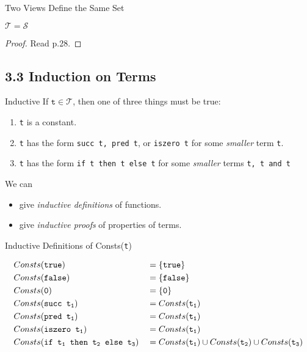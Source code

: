 \begin{frame}{Two Views Define the Same Set}
\begin{proposition}[3.2.6]
  $\mathcal{T} = \mathcal{S}$
\end{proposition}
\begin{proof}
  Read p.28.
\end{proof}
\end{frame}

\subsection*{3.3 Induction on Terms}

\begin{frame}{Inductive}
If $\mathtt{t} \in \mathcal{T}$, then one of three things must be true:
\begin{enumerate}
  \item \texttt{t} is a constant.
  \item \texttt{t} has the form \texttt{succ t, pred t}, or \texttt{iszero t} for some \textit{smaller} term \texttt{t}.
  \item \texttt{t} has the form \texttt{if t then t else t} for some \textit{smaller} terms \texttt{t, t and t}
\end{enumerate}
We can
\begin{itemize}
  \item give \textit{inductive definitions} of functions.
  \item give \textit{inductive proofs} of properties of terms.
\end{itemize}
\end{frame}

\begin{frame}{Inductive Definitions of Consts(\texttt{t})}
\begin{definition}[3.3.1]
\begin{alignat*}{2}
  &Consts(\texttt{true}) &&= \{\texttt{true}\}\\
  &Consts(\texttt{false}) &&= \{\texttt{false}\}\\
  &Consts(\texttt{0}) &&= \{\texttt{0}\}\\
  &Consts(\texttt{succ t\textsubscript{1}}) &&= Consts(\texttt{t\textsubscript{1}})\\
  &Consts(\texttt{pred t\textsubscript{1}}) &&= Consts(\texttt{t\textsubscript{1}})\\
  &Consts(\texttt{iszero t\textsubscript{1}}) &&= Consts(\texttt{t\textsubscript{1}})\\
  &Consts(\texttt{if t\textsubscript{1} then t\textsubscript{2} else t\textsubscript{3}}) &&= Consts(\texttt{t\textsubscript{1}}) \cup Consts(\texttt{t\textsubscript{2}}) \cup Consts(\texttt{t\textsubscript{3}})
\end{alignat*}
\end{definition}
\end{frame}

